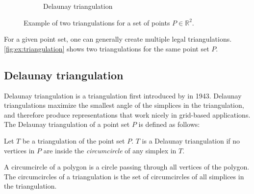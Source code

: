 \begin{figure}[ht]
\begin{subfigure}[b]{0.4\textwidth}
        \caption{Delaunay triangulation}
        \label{fig:triangulation-delaunay}
    \end{subfigure}
    \caption[Example of triangulation]{Example of two triangulations for a set of points $P \in \mathbb{R}^2$.}
    \label{fig:ex:triangulation}
\end{figure}

For a given point set, one can generally create multiple legal triangulations. \autoref{fig:ex:triangulation} shows two triangulations for the same point set $P$.


\subsection{Delaunay triangulation}
Delaunay triangulation is a triangulation first introduced by \textcite{delaunay_1943} in 1943. Delaunay triangulations maximize the smallest angle of the simplices in the triangulation, and therefore produce representations that work nicely in grid-based applications. The Delaunay triangulation of a point set $P$ is defined as follows:
\begin{definition}
\label{def:delaunay}
Let $T$ be a triangulation of the point set $P$. $T$ is a Delaunay triangulation if no vertices in $P$ are inside the \emph{circumcircle} of any simplex in $T$.
\end{definition}

\begin{definition}[Circumcircle]
A circumcircle of a polygon is a circle passing through all vertices of the polygon. The circumcircles of a triangulation is the set of circumcircles of all simplices in the triangulation.
\end{definition}

